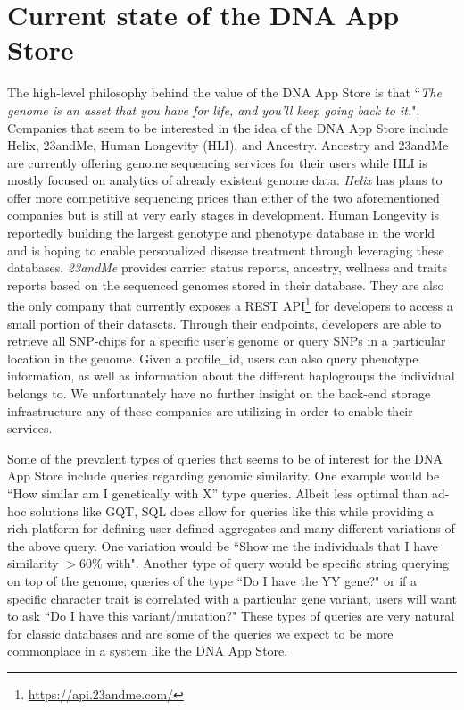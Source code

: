 \documentclass[conference,twocolumn,10pt]{IEEEtran}
\begin{document}
\section{Current state of the DNA App Store}
The high-level philosophy behind the value of the DNA App Store is that ``\textit{The genome is an asset that you have for life, and you’ll keep going back to it.}"\cite{DNAappstore}.
Companies that seem to be interested in the idea of the DNA App Store include Helix, 23andMe, Human Longevity (HLI), and  Ancestry. Ancestry and 23andMe are currently offering genome sequencing services for their users while HLI is mostly focused on analytics of already existent genome data. \textit{Helix} has plans to offer more competitive sequencing prices than either of the two aforementioned companies but is still at very early stages in development. Human Longevity is reportedly building the largest genotype and phenotype database in the world and is hoping to enable personalized disease treatment through leveraging these databases. \textit{23andMe} provides carrier status reports, ancestry, wellness and traits reports based on the sequenced genomes stored in their database. They are also the only company that currently exposes a REST API\footnote{\small \url{https://api.23andme.com/}} for developers to access a small portion of their datasets. Through their endpoints, developers are able to retrieve all SNP-chips for a specific user's genome or query SNPs in a particular location in the genome. Given a profile\_id, users can also query phenotype information, as well as information about the different haplogroups the individual belongs to. We unfortunately have no further insight on the back-end storage infrastructure any of these companies are utilizing in order to enable their services.

Some of the prevalent types of queries that seems to be of interest for the DNA App Store include queries regarding genomic similarity. One example would be ``How similar am I genetically with X'' type queries. Albeit less optimal than ad-hoc solutions like GQT, SQL does allow for queries like this while providing a rich platform for defining user-defined aggregates and many different variations of the above query. One variation would be ``Show me the individuals that I have similarity $> 60\%$ with". Another type of query would be specific string querying on top of the genome; queries of the type ``Do I have the YY gene?" or if a specific character trait is correlated with a particular gene variant, users will want to ask ``Do I have this variant/mutation?" These types of queries are very natural for classic databases and are some of the queries we expect to be more commonplace in a system like the DNA App Store.
\end{document}
